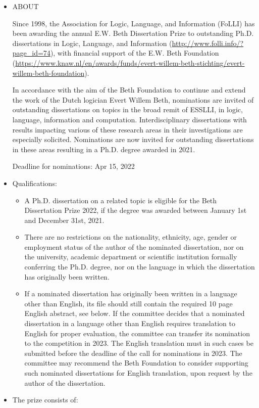 \documentclass[prodmode,acmtecs]{acmsmall} %
\begin{document}
\begin{itemize}\item  ABOUT 
 
  Since 1998, the Association for Logic, Language, and Information (FoLLI) has been awarding the annual E.W. Beth Dissertation Prize to outstanding Ph.D. dissertations in Logic, Language, and Information (\href{http://www.folli.info/?page_id=74}{http://www.folli.info/?page\_id=74}), with financial support of the E.W. Beth Foundation (\href{https://www.knaw.nl/en/awards/funds/evert-willem-beth-stichting/evert-willem-beth-foundation}{https://www.knaw.nl/en/awards/funds/evert-willem-beth-stichting/evert-willem-beth-foundation}).  
 
  In accordance with the aim of the Beth Foundation to continue and extend the work of the Dutch logician Evert Willem Beth, nominations are invited of outstanding dissertations on topics in the broad remit of ESSLLI, in logic, language, information and computation. Interdisciplinary dissertations with results impacting various of these research areas in their investigations are especially solicited. Nominations are now invited for outstanding dissertations in these areas resulting in a Ph.D. degree awarded in 2021.  
 
Deadline for nominations: Apr 15, 2022 
 
\item  Qualifications: 
 
\begin{itemize}\item  A Ph.D. dissertation on a related topic is eligible for the Beth Dissertation Prize 2022, if the degree was awarded between January 1st and December 31st, 2021.
\item  There are no restrictions on the nationality, ethnicity, age, gender or employment status of the author of the nominated dissertation, nor on the university, academic department or scientific institution formally conferring the Ph.D. degree, nor on the language in which the dissertation has originally been written.
\item  If a nominated dissertation has originally been written in a language other than English, its file should still contain the required 10 page English abstract, see below. If the committee decides that a nominated dissertation in a language other than English requires translation to English for proper evaluation, the committee can transfer its nomination to the competition in 2023. The English translation must in such cases be submitted before the deadline of the call for nominations in 2023. The committee may recommend the Beth Foundation to consider supporting such nominated dissertations for English translation, upon request by the author of the dissertation. 
\end{itemize} 
\item  The prize consists of:  
 

\end{itemize}
\end{document}
